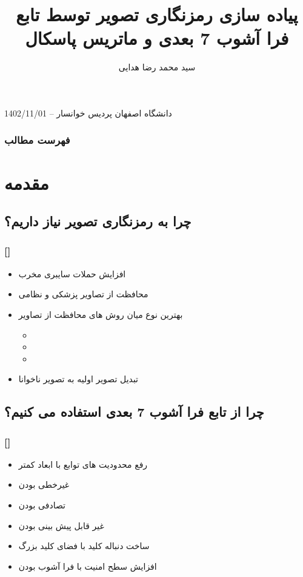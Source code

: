 \documentclass[xcolor=dvipsnames, professionalfonts, 11pt]{beamer}
\author[]{#2%
\IfValueT{#3}{\vspace{5mm}\\#3}%
\IfValueT{#1}{\vspace{5mm}\\\color{mygray}{\footnotesize \lr{Available at \url{#1}}}}%
}\date[]{}}
\author{سید محمد رضا هدایی}
\institute{}
\newcommand*{\makeframetitle}{\frametitle{\insertsection \hspace{0.1em} {\footnotesize [\insertsubsection]}}}
\let\oldtitle\title
\renewcommand{\title}[1]{\oldtitle[]{\MakeLowercase{#1}\vspace{-2mm}\\\color{myblack}{\rule{\textwidth}{2pt}}\vspace{1cm}}}
\begin{document}
\title{پیاده سازی رمزنگاری تصویر توسط تابع فرا آشوب 7 بعدی و ماتریس پاسکال}
%
{دانشگاه اصفهان پردیس خوانسار -- 1402/11/01}
\frame{\titlepage}

\begin{frame}
    \frametitle{فهرست مطالب}
\end{frame}

\section{مقدمه}
\subsection{چرا به رمزنگاری تصویر نیاز داریم؟}
\begin{frame}
    \makeframetitle
    \begin{itemize}
        \item {افزایش حملات سایبری مخرب}
        \item{محافظت از تصاویر پزشکی و نظامی}
        \item{بهترین نوع میان روش های محافظت از تصاویر}
        \begin{itemize}
            \item {}
            \item {}
            \item {}
        \end{itemize}
        \item تبدیل تصویر اولیه به تصویر ناخوانا
    \end{itemize}
\end{frame}

\subsection{چرا از تابع فرا آشوب 7 بعدی استفاده می کنیم؟}
\begin{frame}
    \makeframetitle
    \begin{itemize}
        \item رفع محدودیت های توابع با ابعاد کمتر
        \item غیرخطی بودن
        \item تصادفی بودن
        \item غیر قابل پیش بینی بودن
        \item ساخت دنباله کلید با فضای کلید بزرگ
        \item افزایش سطح امنیت با فرا آشوب بودن
      \end{itemize}
\end{frame}
\end{document}
